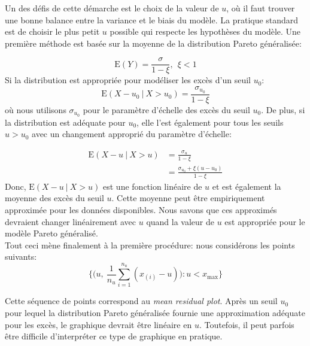 Un des défis de cette démarche est le choix de la valeur de $u$, où il faut trouver une bonne balance entre la variance et le biais du modèle. La pratique standard est de choisir le plus petit $u$ possible qui respecte les hypothèses du modèle. Une première méthode est basée sur la moyenne de la distribution Pareto généralisée:

\begin{equation}\label{eq:1.2.2}
{\text{E}(Y) = \frac{\sigma}{1-\xi},\ \ \xi <1}
\end{equation}
Si la distribution est appropriée pour modéliser les excès d'un seuil $u_0$:
\begin{equation}\label{eq:1.2.3}
{\text{E}(X-u_0\ |\ X>u_0) = \frac{\sigma_{u_{0}}}{1- \xi}}
\end{equation}
où nous utilisons $\sigma_{u_{0}}$ pour le paramètre d'échelle des excès du seuil $u_0$. De plus, si la distribution est adéquate pour $u_0$, elle l'est également pour tous les seuils $u>u_0$ avec un changement approprié du paramètre d'échelle:

\begin{equation}\label{eq:1.2.4}
\begin{split}
\text{E}(X-u\ |\ X>u) &= {\frac{\sigma_u}{1-\xi}}\\
    &= {\frac{\sigma_{u_0} + \xi{(u-u_0)}}{1-\xi}}
\end{split}
\end{equation}
Donc, $\text{E}(X-u\ |\ X>u)$ est une fonction linéaire de $u$ et est également la moyenne des excès du seuil $u$. Cette moyenne peut être empiriquement approximée pour les données disponibles. Nous savons que ces approximés devraient changer linéairement avec $u$ quand la valeur de $u$ est appropriée pour le modèle Pareto généralisé. \\

Tout ceci mène finalement à la première procédure: nous considérons les points suivants:
\begin{equation}\label{eq:1.2.5}
\Bigg\{\Bigg(u,\ \frac{1}{n_u}\sum_{i=1}^{n_u}(x_{(i)} - u) \Bigg): u<x_{\text{max}}  \Bigg\}
\end{equation}

Cette séquence de points correspond au \textit{mean residual plot}. Après un seuil $u_0$ pour lequel la distribution Pareto généralisée fournie une approximation adéquate pour les excès, le graphique devrait être linéaire en $u$. Toutefois, il peut parfois être difficile d'interpréter ce type de graphique en pratique. \\

